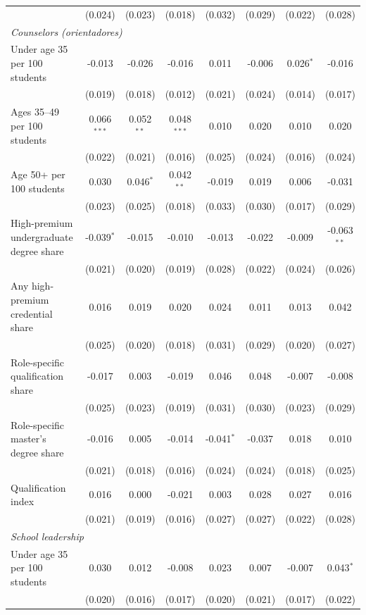 \begin{table}[!htbp]
{\begin{tabular}{lccccccc}
 & (0.024) & (0.023) & (0.018) & (0.032) & (0.029) & (0.022) & (0.028) \\
\multicolumn{8}{l}{\textit{Counselors (orientadores)}} \\
\quad Under age 35 per 100 students & -0.013 & -0.026 & -0.016 & 0.011 & -0.006 & 0.026$^{*}$ & -0.016 \\
 & (0.019) & (0.018) & (0.012) & (0.021) & (0.024) & (0.014) & (0.017) \\
\quad Ages 35--49 per 100 students & 0.066$^{***}$ & 0.052$^{**}$ & 0.048$^{***}$ & 0.010 & 0.020 & 0.010 & 0.020 \\
 & (0.022) & (0.021) & (0.016) & (0.025) & (0.024) & (0.016) & (0.024) \\
\quad Age 50+ per 100 students & 0.030 & 0.046$^{*}$ & 0.042$^{**}$ & -0.019 & 0.019 & 0.006 & -0.031 \\
 & (0.023) & (0.025) & (0.018) & (0.033) & (0.030) & (0.017) & (0.029) \\
\quad High-premium undergraduate degree share & -0.039$^{*}$ & -0.015 & -0.010 & -0.013 & -0.022 & -0.009 & -0.063$^{**}$ \\
 & (0.021) & (0.020) & (0.019) & (0.028) & (0.022) & (0.024) & (0.026) \\
\quad Any high-premium credential share & 0.016 & 0.019 & 0.020 & 0.024 & 0.011 & 0.013 & 0.042 \\
 & (0.025) & (0.020) & (0.018) & (0.031) & (0.029) & (0.020) & (0.027) \\
\quad Role-specific qualification share & -0.017 & 0.003 & -0.019 & 0.046 & 0.048 & -0.007 & -0.008 \\
 & (0.025) & (0.023) & (0.019) & (0.031) & (0.030) & (0.023) & (0.029) \\
\quad Role-specific master's degree share & -0.016 & 0.005 & -0.014 & -0.041$^{*}$ & -0.037 & 0.018 & 0.010 \\
 & (0.021) & (0.018) & (0.016) & (0.024) & (0.024) & (0.018) & (0.025) \\
\quad Qualification index & 0.016 & 0.000 & -0.021 & 0.003 & 0.028 & 0.027 & 0.016 \\
 & (0.021) & (0.019) & (0.016) & (0.027) & (0.027) & (0.022) & (0.028) \\
\multicolumn{8}{l}{\textit{School leadership}} \\
\quad Under age 35 per 100 students & 0.030 & 0.012 & -0.008 & 0.023 & 0.007 & -0.007 & 0.043$^{*}$ \\
 & (0.020) & (0.016) & (0.017) & (0.020) & (0.021) & (0.017) & (0.022) \\

\end{tabular}}
\end{table}
